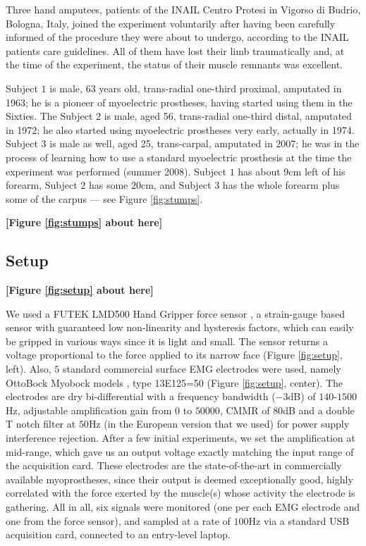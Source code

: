 \documentclass[review,authoryear]{elsarticle}
\renewcommand{\cite}{\citep}
\begin{document}
Three hand amputees, patients of the INAIL Centro Protesi in Vigorso
di Budrio, Bologna, Italy, joined the experiment voluntarily after
having been carefully informed of the procedure they were about to undergo,
according to the INAIL patients care guidelines. All of them have lost
their limb traumatically and, at the time of the experiment, the status of
their muscle remnants was excellent.

Subject $1$ is male, 63 years old, trans-radial
one-third proximal, amputated in 1963; he is a
pioneer of myoelectric prostheses, having started using them in the
Sixties. The Subject $2$ is male, aged 56, trans-radial one-third
distal, amputated in 1972; he also started using myoelectric prostheses
very early, actually in 1974. Subject $3$ is male as well, aged 25,
trans-carpal, amputated in 2007; he was in the process of learning how
to use a standard myoelectric prosthesis at the time the experiment was
performed (summer 2008). Subject $1$ has about $9$cm left of his
forearm, Subject $2$ has some $20$cm, and Subject $3$ has the whole forearm
plus some of the carpus --- see Figure \ref{fig:stumps}.

\noindent \textbf{[Figure \ref{fig:stumps} about here]}

\subsection{Setup}

\noindent \textbf{[Figure \ref{fig:setup} about here]}

We used a FUTEK LMD500 Hand Gripper force sensor \cite{futek}, a strain-gauge
based sensor with guaranteed low non-linearity and hysteresis factors, which can easily
be gripped in various ways since it is light and small. The sensor returns a
voltage proportional to the force applied to its narrow face (Figure \ref{fig:setup}, left).
Also, $5$ standard commercial surface EMG electrodes were used, namely OttoBock
Myobock models \cite{myobock}, type 13E125=50 (Figure \ref{fig:setup}, center).
The electrodes are dry bi-differential with a frequency bandwidth ($-3$dB) of
$140$-$1500$Hz, adjustable amplification gain from $0$ to $50000$, CMMR of
$80$dB and a double T notch filter at $50$Hz (in the European version
that we used) for power supply interference rejection. After a few initial
experiments, we set the amplification at mid-range, which gave us an output voltage
exactly matching the input range of the acquisition card.
These electrodes are the state-of-the-art in commercially available myoprostheses,
since their output is deemed exceptionally good, highly correlated with the
force exerted by the muscle(s) whose activity the electrode is gathering.
All in all, six signals were monitored (one per each EMG electrode and one from the
force sensor), and sampled at a rate of $100$Hz via a standard USB acquisition card,
connected to an entry-level laptop.
\end{document}
